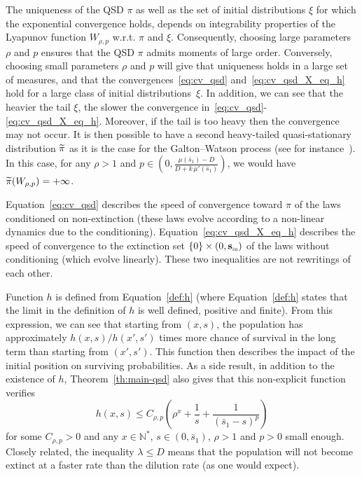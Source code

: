 \documentclass[AHL,Unicode,longabstracts,published]{cedram}
\newcommand{\NN}{\mathbb{N}}
\newcommand{\Sin}{{\mathbf s}_{\textrm{\tiny\rm in}}}
\newcommand{\1}{\mathbf{1}}
\let\oldtilde\tilde
\renewcommand*{\tilde}[1]{\mathchoice{\widetilde{#1}}{\widetilde{#1}}{\oldtilde{#1}}{\oldtilde{#1}}}
\begin{document}
The uniqueness of the QSD $\pi$ as well as the set of initial distributions $\xi$ for which the exponential convergence holds, depends on integrability properties of the Lyapunov function $W_{\rho,p}$ w.r.t. $\pi$ and $\xi$. Consequently, choosing large parameters $\rho$ and $p$ ensures that the QSD $\pi$ admits moments of large order. Conversely, choosing small parameters $\rho$ and $p$ will give that uniqueness holds in a large set of measures, and that the convergences~\eqref{eq:cv_qsd} and~\eqref{eq:cv_qsd_X_eq_h} hold for a large class of initial distributions~$\xi$. In addition, we can see that the heavier the tail $\xi$, the slower the convergence in~\eqref{eq:cv_qsd}-\eqref{eq:cv_qsd_X_eq_h}. Moreover, if the tail is too heavy then the convergence may not occur. It is then possible to have a second heavy-tailed quasi-stationary distribution $\tilde \pi$ as it is the case for the Galton--Watson process (see for instance~\cite{MV12}). In this case, for any $\rho>1$ and $p\in(0,\frac{\mu(\bar s_1)-D}{D+k\,\mu'(\bar s_1)})$, we would have $\tilde \pi(W_{\rho,p})=+\infty$.


Equation~\ref{eq:cv_qsd} describes the speed of convergence toward $\pi$ of the laws conditioned on non-extinction (these laws evolve according to a non-linear dynamics due to the conditioning). Equation~\ref{eq:cv_qsd_X_eq_h} describes the speed of convergence to the extinction set $\{0\}\times (0,\Sin)$ of the laws without conditioning (which evolve linearly). These two inequalities are not rewritings of each other.

Function $h$ is defined from Equation~\eqref{def:h} (where Equation~\eqref{def:h} states that the limit in the definition of $h$ is well defined, positive and finite). From this expression, we can see that starting from $(x,s)$, the population has approximately $h(x,s)/h(x',s')$ times more chance of survival in the long term than starting from $(x',s')$. This function then describes the impact of the initial position on surviving probabilities. As a side result, in addition to the existence of $h$, Theorem~\ref{th:main-qsd} also gives that this non-explicit function verifies
\[
h(x,s) \leq C_{\rho,p} \left(\rho^x + \frac{1}{s} + \frac{1}{(\bar{s}_1 -s)^p} \right)
\]
for some $C_{\rho,p}>0$ and any $x \in \NN^*$, $s\in (0,\bar{s}_1)$, $\rho>1$ and $p>0$ small enough. Closely related, the inequality $\lambda \leq D$ means that the population will not become extinct at a faster rate than the dilution rate (as one would expect).
\end{document}
